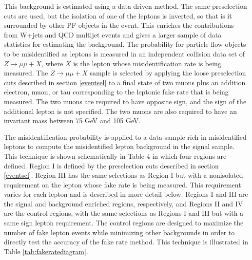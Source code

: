 \documentclass[oneside, letterpaper, oldfontcommands]{memoir}
\begin{document}
\qquad This background is estimated using a data driven method. The same preselection cuts are used, but the isolation of one of the leptons is inverted, so that is it surrounded by other PF objects in the event. This enriches the contributions from W+jets and QCD multijet events and gives a larger sample of data statistics for estimating the background. 
The probability for particle flow objects to be misidentified as leptons is measured in an independent collision data set of $Z \rightarrow \mu\mu + X$, where $X$ is the lepton whose misidentification rate is being measured. The $Z \rightarrow \mu\mu + X$ sample is selected by applying the loose preselection cuts described in section \ref{eventsel} to a final state of two muons plus an addition electron, muon, or tau corresponding to the leptonic fake rate that is being measured. The two muons are required to have opposite sign, and the sign of the additional lepton is not specified. The two muons are also required to have an invariant mass between 75 GeV and 105 GeV.

\qquad The misidentification probability is applied to a data sample rich in misidentified leptons to compute the misidentified lepton background in the signal sample. This technique is shown schematically in Table 4 in which four regions are defined. Region I is defined by the preselection cuts described in section \ref{eventsel}. Region III has the same selections as Region I but with a nonisolated requirement on the lepton whose fake rate is being measured. This requirement varies for each lepton and is described in more detail below. Regions I and III are the signal and background enriched regions, respectively, and Regions II and IV are the control regions, with the same selections as Regions I and III but with a same sign lepton requirement. The control regions are designed to maximize the number of fake lepton events while minimizing other backgrounds in order to directly test the accuracy of the fake rate method. This technique is illustrated in Table \ref{tab:fakeratediagram}. 
\end{document}
